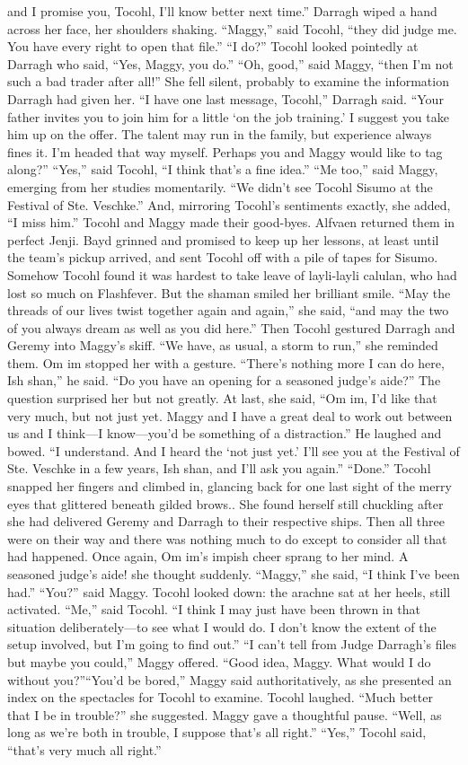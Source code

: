 \documentclass[9pt]{article}
\begin{document}
and I promise you, Tocohl, I’ll know better next time.”
Darragh wiped a hand across her face, her shoulders shaking.
“Maggy,” said Tocohl, “they did judge me. You have every right to open that file.”
“I do?”
Tocohl looked pointedly at Darragh who said, “Yes, Maggy, you do.”
“Oh, good,” said Maggy, “then I’m not such a bad trader after all!” She fell silent, probably to
examine the information Darragh had given her.
“I have one last message, Tocohl,” Darragh said. “Your father invites you to join him for a little ‘on
the job training.’ I suggest you take him up on the offer. The talent may run in the family, but experience
always fines it. I’m headed that way myself. Perhaps you and Maggy would like to tag along?”
“Yes,” said Tocohl, “I think that’s a fine idea.”
“Me too,” said Maggy, emerging from her studies momentarily. “We didn’t see Tocohl Sisumo at the
Festival of Ste. Veschke.” And, mirroring Tocohl’s sentiments exactly, she added, “I miss him.”
Tocohl and Maggy made their good-byes. Alfvaen returned them in perfect Jenji. Bayd grinned and
promised to keep up her lessons, at least until the team’s pickup arrived, and sent Tocohl off with a pile
of tapes for Sisumo.
Somehow Tocohl found it was hardest to take leave of layli-layli calulan, who had lost so much on
Flashfever. But the shaman smiled her brilliant smile. “May the threads of our lives twist together again
and again,” she said, “and may the two of you always dream as well as you did here.”
Then Tocohl gestured Darragh and Geremy into Maggy’s skiff. “We have, as usual, a storm to run,”
she reminded them.
Om im stopped her with a gesture. “There’s nothing more I can do here, Ish shan,” he said. “Do you
have an opening for a seasoned judge’s aide?”
The question surprised her but not greatly. At last, she said, “Om im, I’d like that very much, but not
just yet. Maggy and I have a great deal to work out between us and I think—I know—you’d be
something of a distraction.”
He laughed and bowed. “I understand. And I heard the ‘not just yet.’ I’ll see you at the Festival of
Ste. Veschke in a few years, Ish shan, and I’ll ask you again.”
“Done.” Tocohl snapped her fingers and climbed in, glancing back for one last sight of the merry eyes
that glittered beneath gilded brows.. She found herself still chuckling after she had delivered Geremy and
Darragh to their respective ships.
Then all three were on their way and there was nothing much to do except to consider all that had
happened. Once again, Om im’s impish cheer sprang to her mind.
A seasoned judge’s aide! she thought suddenly.
“Maggy,” she said, “I think I’ve been had.”
“You?” said Maggy. Tocohl looked down: the arachne sat at her heels, still activated.
“Me,” said Tocohl. “I think I may just have been thrown in that situation deliberately—to see what I
would do. I don’t know the extent of the setup involved, but I’m going to find out.”
“I can’t tell from Judge Darragh’s files but maybe you could,” Maggy offered.
“Good idea, Maggy. What would I do without you?”“You’d be bored,” Maggy said authoritatively, as she presented an index on the spectacles for
Tocohl to examine.
Tocohl laughed. “Much better that I be in trouble?” she suggested.
Maggy gave a thoughtful pause. “Well, as long as we’re both in trouble, I suppose that’s all right.”
“Yes,” Tocohl said, “that’s very much all right.”
\end{document}
